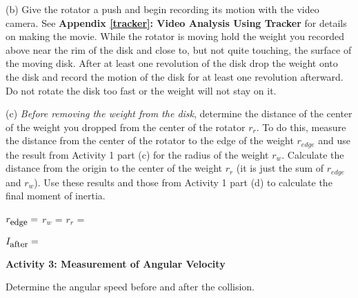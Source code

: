 (b) Give the rotator a push and begin recording its motion with the video camera. See \textbf{Appendix \ref{tracker}: Video Analysis Using Tracker} for details on making the movie. 
While the rotator is moving hold the weight you recorded above near the rim of the disk and 
close to, but not quite touching, the surface of the moving disk. After at least one revolution
of the disk drop the weight onto the disk and record the motion of the disk for at least one 
revolution afterward. Do not rotate the disk too fast or the weight will not stay on it.

(c) \textit{Before removing the weight from the disk}, determine the distance of the center of the weight you dropped from the center of the rotator \( r_{r} \). To do this, measure the distance from the center of the rotator to the edge of the weight \( r_{edge} \) and use the result from Activity 1 part (c) for the radius of the weight \( r_{w} \). Calculate the distance from the origin to the center of the weight \( r_{r} \) (it is just the sum of \( r_{edge} \) and \( r_{w} \)). Use these results and those from Activity 1 part (d) to calculate the final moment of inertia.
\vspace{5mm}

\( r_{\mbox{\small edge}}  =\) \hfill{}\( r_{w} \) = \hfill{}\( r_{r} \) =\hfill{}
\vspace{5mm}

\( I_{\mbox{\small after}} =\)  
\vspace{5mm}

\textbf{Activity 3: Measurement of Angular Velocity}

Determine the angular speed before and after the collision.

